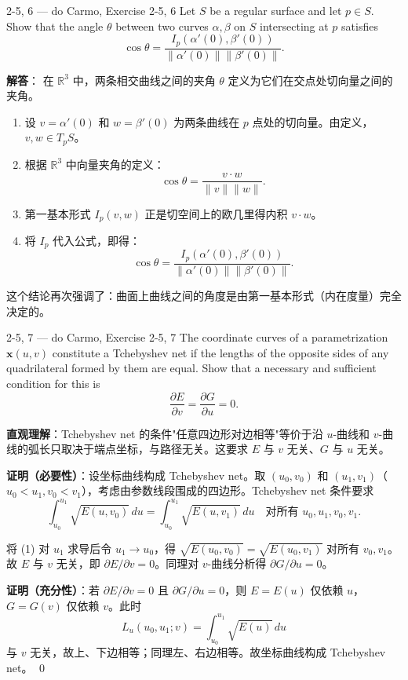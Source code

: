 \begin{exercise}{2-5, 6 — do Carmo, Exercise 2-5, 6}
Let $S$ be a regular surface and let $p \in S$. Show that the angle $\theta$ between two curves $\alpha, \beta$ on $S$ intersecting at $p$ satisfies
\[
\cos\theta = \frac{I_p(\alpha'(0), \beta'(0))}{\|\alpha'(0)\| \|\beta'(0)\|}.
\]
\end{exercise}

\begin{solution}
\textbf{解答}：
在 $\mathbb{R}^3$ 中，两条相交曲线之间的夹角 $\theta$ 定义为它们在交点处切向量之间的夹角。

\begin{enumerate}
    \item 设 $v = \alpha'(0)$ 和 $w = \beta'(0)$ 为两条曲线在 $p$ 点处的切向量。由定义，$v, w \in T_pS$。
    \item 根据 $\mathbb{R}^3$ 中向量夹角的定义：
    \[
    \cos\theta = \frac{v \cdot w}{\|v\| \|w\|}.
    \]
    \item 第一基本形式 $I_p(v, w)$ 正是切空间上的欧几里得内积 $v \cdot w$。
    \item 将 $I_p$ 代入公式，即得：
    \[
    \cos\theta = \frac{I_p(\alpha'(0), \beta'(0))}{\|\alpha'(0)\| \|\beta'(0)\|}.
    \]
\end{enumerate}
这个结论再次强调了：曲面上曲线之间的角度是由第一基本形式（内在度量）完全决定的。
\end{solution}

\begin{exercise}{2-5, 7 — do Carmo, Exercise 2-5, 7}
The coordinate curves of a parametrization $\mathbf{x}(u, v)$ constitute a Tchebyshev net if the lengths of the opposite sides of any quadrilateral formed by them are equal. Show that a necessary and sufficient condition for this is
\[
\frac{\partial E}{\partial v} = \frac{\partial G}{\partial u} = 0.
\]
\end{exercise}

\begin{solution}
\textbf{直观理解}：Tchebyshev net 的条件"任意四边形对边相等"等价于沿 $u$-曲线和 $v$-曲线的弧长只取决于端点坐标，与路径无关。这要求 $E$ 与 $v$ 无关、$G$ 与 $u$ 无关。

\textbf{证明（必要性）}：设坐标曲线构成 Tchebyshev net。取 $(u_0,v_0)$ 和 $(u_1,v_1)$（$u_0 < u_1, v_0 < v_1$），考虑由参数线段围成的四边形。Tchebyshev net 条件要求
\[
\int_{u_0}^{u_1} \sqrt{E(u,v_0)}\, du = \int_{u_0}^{u_1} \sqrt{E(u,v_1)}\, du
\quad \text{对所有 } u_0,u_1,v_0,v_1.
\tag{1}
\]

将 (1) 对 $u_1$ 求导后令 $u_1 \to u_0$，得 $\sqrt{E(u_0,v_0)} = \sqrt{E(u_0,v_1)}$ 对所有 $v_0,v_1$。故 $E$ 与 $v$ 无关，即 $\partial E/\partial v = 0$。同理对 $v$-曲线分析得 $\partial G/\partial u = 0$。

\textbf{证明（充分性）}：若 $\partial E/\partial v = 0$ 且 $\partial G/\partial u = 0$，则 $E = E(u)$ 仅依赖 $u$，$G = G(v)$ 仅依赖 $v$。此时
\[
L_u(u_0,u_1;v) = \int_{u_0}^{u_1} \sqrt{E(u)}\, du
\]
与 $v$ 无关，故上、下边相等；同理左、右边相等。故坐标曲线构成 Tchebyshev net。
\qed
\end{solution}

